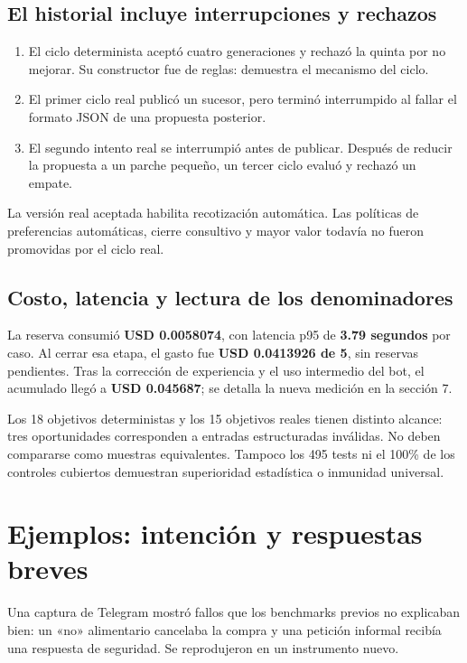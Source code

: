 \documentclass[11pt,a4paper]{article}
\begin{document}
\subsection{El historial incluye interrupciones y rechazos}
\begin{enumerate}
\item El ciclo determinista aceptó cuatro generaciones y rechazó la quinta por no
mejorar. Su constructor fue de reglas: demuestra el mecanismo del ciclo.
\item El primer ciclo real publicó un sucesor, pero terminó interrumpido al fallar
el formato JSON de una propuesta posterior.
\item El segundo intento real se interrumpió antes de publicar. Después de reducir
la propuesta a un parche pequeño, un tercer ciclo evaluó y rechazó un empate.
\end{enumerate}
La versión real aceptada habilita recotización automática. Las políticas de
preferencias automáticas, cierre consultivo y mayor valor todavía no fueron
promovidas por el ciclo real.

\subsection{Costo, latencia y lectura de los denominadores}
La reserva consumió \textbf{USD 0.0058074}, con latencia p95 de \textbf{3.79 segundos}
por caso. Al cerrar esa etapa, el gasto fue \textbf{USD 0.0413926 de 5}, sin reservas
pendientes. Tras la corrección de experiencia y el uso intermedio del bot, el
acumulado llegó a \textbf{USD 0.045687}; se detalla la nueva medición en la sección 7.

\begin{limite}
Los 18 objetivos deterministas y los 15 objetivos reales tienen distinto alcance:
tres oportunidades corresponden a entradas estructuradas inválidas. No deben
compararse como muestras equivalentes. Tampoco los 495 tests ni el 100\% de los
controles cubiertos demuestran superioridad estadística o inmunidad universal.
\end{limite}

\newpage
\section{Ejemplos: intención y respuestas breves}
Una captura de Telegram mostró fallos que los benchmarks previos no explicaban
bien: un «no» alimentario cancelaba la compra y una petición informal recibía una
respuesta de seguridad. Se reprodujeron en un instrumento nuevo.
\end{document}

